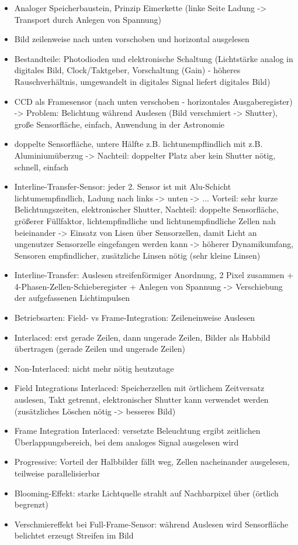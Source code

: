 \documentclass[paper=a4, fontsize=11pt]{scrartcl} %
\numberwithin{equation}{section} %
\numberwithin{figure}{section} %
\numberwithin{table}{section} %
\begin{document}
\begin{itemize}
\item Analoger Speicherbaustein, Prinzip Eimerkette (linke Seite Ladung -> Transport durch Anlegen von Spannung)
\item Bild zeilenweise nach unten vorschoben und horizontal ausgelesen
\item Bestandteile: Photodioden und elektronische Schaltung (Lichtstärke analog in digitales Bild, Clock/Taktgeber, Vorschaltung (Gain) - höheres Rauschverhältnis, umgewandelt in digitales Signal liefert digitales Bild)
\item CCD als Framesensor (nach unten verschoben - horizontales Ausgaberegister) -> Problem: Belichtung während Auslesen (Bild verschmiert -> Shutter), große Sensorfläche, einfach, Anwendung in der Astronomie
\item doppelte Sensorfläche, untere Hälfte z.B. lichtunempflindlich mit z.B. Aluminiumüberzug -> Nachteil: doppelter Platz aber kein Shutter nötig, schnell, einfach
\item Interline-Transfer-Sensor: jeder 2. Sensor ist mit Alu-Schicht lichtumempfindlich, Ladung nach links -> unten -> ... Vorteil: sehr kurze Belichtungszeiten, elektronischer Shutter, Nachteil: doppelte Sensorfläche, größerer Füllfaktor, lichtempfindliche und lichtunempfindliche Zellen nah beieinander -> Einsatz von Lisen über Sensorzellen, damit Licht an ungenutzer Sensorzelle eingefangen werden kann -> höherer Dynamikumfang, Sensoren empfindlicher, zusätzliche Linsen nötig (sehr kleine Linsen)
\item Interline-Transfer: Auslesen streifenförmiger Anordnung, 2 Pixel zusammen + 4-Phasen-Zellen-Schieberegister + Anlegen von Spannung -> Verschiebung der aufgefassenen Lichtimpulsen
\item Betriebsarten: Field- vs Frame-Integration: Zeileneinweise Auslesen
\item Interlaced: erst gerade Zeilen, dann ungerade Zeilen, Bilder als Habbild übertragen (gerade Zeilen und ungerade Zeilen)
\item Non-Interlaced: nicht mehr nötig heutzutage
\item Field Integrations Interlaced: Speicherzellen mit örtlichem Zeitversatz auslesen, Takt getrennt, elektronischer Shutter kann verwendet werden (zusätzliches Löschen nötig -> besseres Bild)
\item Frame Integration Interlaced: versetzte Beleuchtung ergibt zeitlichen Überlappungsbereich, bei dem analoges Signal ausgelesen wird
\item Progressive: Vorteil der Halbbilder fällt weg, Zellen nacheinander ausgelesen, teilweise parallelisierbar
\item Blooming-Effekt: starke Lichtquelle strahlt auf Nachbarpixel über (örtlich begrenzt)
\item Verschmiereffekt bei Full-Frame-Sensor: während Auslesen wird Sensorfläche belichtet erzeugt Streifen im Bild
\end{itemize}
\end{document}
